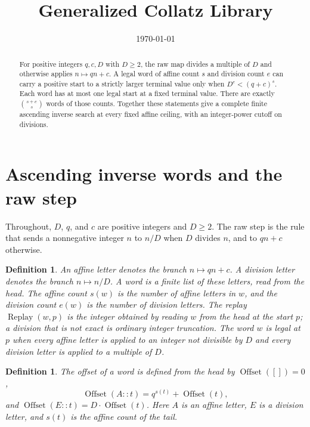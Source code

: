 \documentclass[11pt,letterpaper]{article}
\title{Generalized Collatz Library}
\author{}
\date{\today}
\newtheorem{definition}[theorem]{Definition}
\begin{document}
\maketitle

\begin{abstract}
For positive integers \(q,c,D\) with \(D\ge2\), the raw map divides a multiple of \(D\) and otherwise applies \(n\mapsto qn+c\). A legal word of affine count \(s\) and division count \(e\) can carry a positive start to a strictly larger terminal value only when \(D^e<(q+c)^s\). Each word has at most one legal start at a fixed terminal value. There are exactly \(\binom{s+e}{s}\) words of those counts. Together these statements give a complete finite ascending inverse search at every fixed affine ceiling, with an integer-power cutoff on divisions.
\end{abstract}

\section{Ascending inverse words and the raw step}

Throughout, \(D\), \(q\), and \(c\) are positive integers and \(D\ge 2\). The raw step is the rule that sends a nonnegative integer \(n\) to \(n/D\) when \(D\) divides \(n\), and to \(qn+c\) otherwise.

\begin{definition}
\label{def:letters}
An \emph{affine letter} denotes the branch \(n\mapsto qn+c\). A \emph{division letter} denotes the branch \(n\mapsto n/D\). A \emph{word} is a finite list of these letters, read from the head. The \emph{affine count} \(s(w)\) is the number of affine letters in \(w\), and the \emph{division count} \(e(w)\) is the number of division letters. The \emph{replay} \(\operatorname{Replay}(w,p)\) is the integer obtained by reading \(w\) from the head at the start \(p\); a division that is not exact is ordinary integer truncation. The word \(w\) is \emph{legal} at \(p\) when every affine letter is applied to an integer not divisible by \(D\) and every division letter is applied to a multiple of \(D\).
\end{definition}

\begin{definition}
\label{def:offset}
The \emph{offset} of a word is defined from the head by \(\operatorname{Offset}([])=0\),
\[
\operatorname{Offset}(A{::}t)=q^{s(t)}+\operatorname{Offset}(t),
\]
and \(\operatorname{Offset}(E{::}t)=D\cdot\operatorname{Offset}(t)\). Here \(A\) is an affine letter, \(E\) is a division letter, and \(s(t)\) is the affine count of the tail.
\end{definition}
\end{document}

